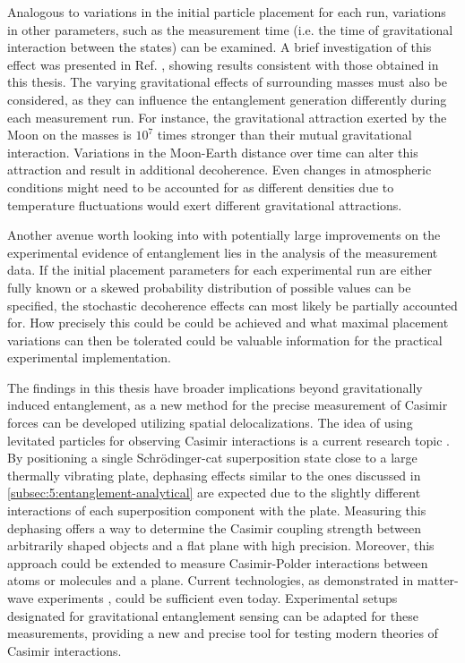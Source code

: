 Analogous to variations in the initial particle placement for each run, variations in other parameters, such as the measurement time (i.e. the time of gravitational interaction between the states) can be examined.
A brief investigation of this effect was presented in Ref. \cite{Nguyen_2020}, showing results consistent with those obtained in this thesis.
The varying gravitational effects of surrounding masses must also be considered, as they can influence the entanglement generation differently during each measurement run. For instance, the gravitational attraction exerted by the Moon on the masses is $10^7$ times stronger than their mutual gravitational interaction.
Variations in the Moon-Earth distance over time can alter this attraction and result in additional decoherence.
Even changes in atmospheric conditions might need to be accounted for as different densities due to temperature fluctuations would exert different gravitational attractions.
 
Another avenue worth looking into with potentially large improvements on the experimental evidence of entanglement lies in the analysis of the measurement data.
If the initial placement parameters for each experimental run are either fully known or a skewed probability distribution of possible values can be specified, the stochastic decoherence effects can most likely be partially accounted for.
How precisely this could be could be achieved and what maximal placement variations can then be tolerated could be valuable information for the practical experimental implementation.

The findings in this thesis have broader implications beyond gravitationally induced entanglement, as a new method for the precise measurement of Casimir forces can be developed utilizing spatial delocalizations.
The idea of using levitated particles for observing Casimir interactions is a current research topic \cite{Xu_2024}.
By positioning a single Schrödinger-cat superposition state close to a large thermally vibrating plate, dephasing effects similar to the ones discussed in \cref{subsec:5:entanglement-analytical} are expected due to the slightly different interactions of each superposition component with the plate.
Measuring this dephasing offers a way to determine the Casimir coupling strength between arbitrarily shaped objects and a flat plane with high precision.
Moreover, this approach could be extended to measure Casimir-Polder interactions between atoms or molecules and a plane.
Current technologies, as demonstrated in matter-wave experiments \cite{Fein_2019}, could be sufficient even today.
Experimental setups designated for gravitational entanglement sensing can be adapted for these measurements, providing a new and precise tool for testing modern theories of Casimir interactions.



